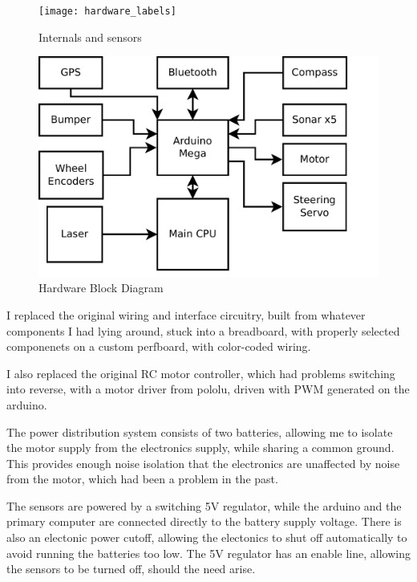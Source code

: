 
\begin{figure}[!h]
\texttt{[image: hardware\_labels]}
\caption{Internals and sensors}
\end{figure}

\begin{figure}
\includegraphics[width=1.0\textwidth]{block_diagram}
\caption{Hardware Block Diagram}
\end{figure}

I replaced the original wiring and interface circuitry, built from whatever components I had lying around, stuck into a breadboard, with properly selected componenets on a custom perfboard, with color-coded wiring.

I also replaced the original RC motor controller, which had problems switching into reverse, with a motor driver from pololu, driven with PWM generated on the arduino.

The power distribution system consists of two batteries, allowing me to isolate the motor supply from the electronics supply, while sharing a common ground. This provides enough noise isolation that the electronics are unaffected by noise from the motor, which had been a problem in the past.

The sensors are powered by a switching 5V regulator, while the arduino and the primary computer are connected directly to the battery supply voltage. There is also an electonic power cutoff, allowing the electonics to shut off automatically to avoid running the batteries too low. The 5V regulator has an enable line, allowing the sensors to be turned off, should the need arise.
